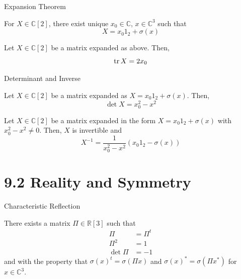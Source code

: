 \begin{frame}{Expansion Theorem}
    \begin{proposition}[9.1.4]
        For $X \in \mathbb{C}[2]$, there exist unique $x_0 \in \mathbb{C}$, $x \in \mathbb{C}^3$ such that
        \[ X = x_0 1_2 + \sigma(x) \]
    \end{proposition}
    \begin{proposition}[9.1.5]
        Let $X \in \mathbb{C}[2]$ be a matrix expanded as above. Then,
        \[ \tr X = 2x_0 \]
    \end{proposition}
\end{frame}

\begin{frame}{Determinant and Inverse}
    \begin{proposition}[9.1.6]
        Let $X \in \mathbb{C}[2]$ be a matrix expanded as $X = x_0 1_2 + \sigma(x)$. Then,
        \[ \det X = x_0^2 - x^2 \]
    \end{proposition}

    \begin{proposition}[9.1.7]
        Let $X \in \mathbb{C}[2]$ be a matrix expanded in the form $X = x_0 1_2 + \sigma(x)$ with $x_0^2 - x^2 \neq 0$. Then, $X$ is invertible and
        \[ X^{-1} = \frac{1}{x_0^2 - x^2}(x_0 1_2 - \sigma(x)) \]
    \end{proposition}
\end{frame}

\section{9.2 Reality and Symmetry}

\begin{frame}{Characteristic Reflection}
    \begin{proposition}[9.2.1]
        There exists a matrix $\Pi \in \mathbb{R}[3]$ such that
        \begin{align*}
            \Pi      & = \Pi^t \\
            \Pi^2    & = 1     \\
            \det \Pi & = -1
        \end{align*}
        and with the property that $\sigma(x)^t = \sigma(\Pi x)$ and $\sigma(x)^* = \sigma(\Pi x^*)$ for $x \in \mathbb{C}^3$.
    \end{proposition}
\end{frame}

